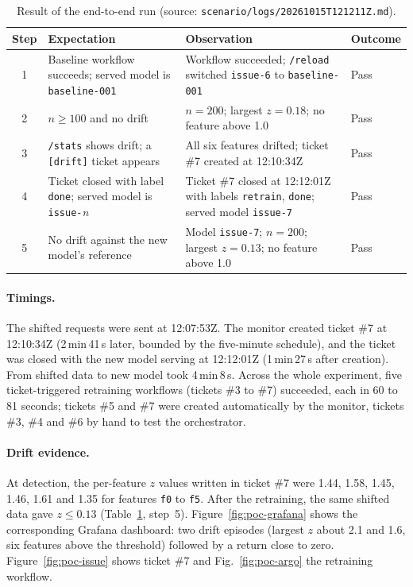 \begin{table}[t]
\centering
\caption{Result of the end-to-end run (source: \texttt{scenario/logs/20261015T121211Z.md}).}
\label{tab:poc-results}
\small
\begin{tabularx}{\textwidth}{@{}c >{\raggedright\arraybackslash}p{4.2cm} X l@{}}
\toprule
Step & Expectation & Observation & Outcome \\
\midrule
1 & Baseline workflow succeeds; served model is \texttt{baseline-001} & Workflow succeeded; \texttt{/reload} switched \texttt{issue-6} to \texttt{baseline-001} & Pass \\
2 & $n \geq 100$ and no drift & $n = 200$; largest $z = 0.18$; no feature above 1.0 & Pass \\
3 & \texttt{/stats} shows drift; a \texttt{[drift]} ticket appears & All six features drifted; ticket \#7 created at 12:10:34Z & Pass \\
4 & Ticket closed with label \texttt{done}; served model is \texttt{issue-}\emph{n} & Ticket \#7 closed at 12:12:01Z with labels \texttt{retrain}, \texttt{done}; served model \texttt{issue-7} & Pass \\
5 & No drift against the new model's reference & Model \texttt{issue-7}; $n = 200$; largest $z = 0.13$; no feature above 1.0 & Pass \\
\bottomrule
\end{tabularx}
\end{table}

\paragraph{Timings.}
The shifted requests were sent at 12:07:53Z. The monitor created ticket \#7 at 12:10:34Z (2\,min\,41\,s later, bounded by the five-minute schedule), and the ticket was closed with the new model serving at 12:12:01Z (1\,min\,27\,s after creation). From shifted data to new model took 4\,min\,8\,s.
Across the whole experiment, five ticket-triggered retraining workflows (tickets \#3 to \#7) succeeded, each in 60 to 81 seconds; tickets \#5 and \#7 were created automatically by the monitor, tickets \#3, \#4 and \#6 by hand to test the orchestrator.

\paragraph{Drift evidence.}
At detection, the per-feature $z$ values written in ticket \#7 were 1.44, 1.58, 1.45, 1.46, 1.61 and 1.35 for features \texttt{f0} to \texttt{f5}. After the retraining, the same shifted data gave $z \leq 0.13$ (Table~\ref{tab:poc-results}, step~5). Figure~\ref{fig:poc-grafana} shows the corresponding Grafana dashboard: two drift episodes (largest $z$ about 2.1 and 1.6, six features above the threshold) followed by a return close to zero. Figure~\ref{fig:poc-issue} shows ticket \#7 and Fig.~\ref{fig:poc-argo} the retraining workflow.

